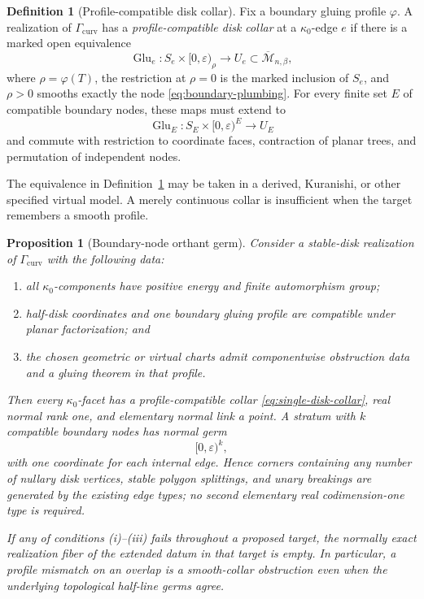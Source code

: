 \documentclass[11pt,letterpaper,twoside]{article}
\theoremstyle{plain}
\newtheorem{proposition}[theorem]{Proposition}
\theoremstyle{definition}
\newtheorem{definition}[theorem]{Definition}
\theoremstyle{remark}
\begin{document}
\begin{definition}[Profile-compatible disk collar]\label{def:profile-compatible-disk-collar}
Fix a boundary gluing profile \(\varphi\).  A realization of \(\Gamma_{\mathrm{curv}}\) has a \emph{profile-compatible disk collar} at a \(\kappa_0\)-edge \(e\) if there is a marked open equivalence
\begin{equation}\label{eq:single-disk-collar}
 \operatorname{Glu}_e:
 S_e\times[0,\varepsilon)_\rho
 \longrightarrow U_e\subset\overline{\mathcal M}_{n,\beta},
\end{equation}
where \(\rho=\varphi(T)\), the restriction at \(\rho=0\) is the marked inclusion of \(S_e\), and \(\rho>0\) smooths exactly the node \eqref{eq:boundary-plumbing}.  For every finite set \(E\) of compatible boundary nodes, these maps must extend to
\begin{equation}\label{eq:multi-disk-collar}
 \operatorname{Glu}_E:
 S_E\times[0,\varepsilon)^E
 \longrightarrow U_E
\end{equation}
and commute with restriction to coordinate faces, contraction of planar trees, and permutation of independent nodes.
\end{definition}

The equivalence in Definition~\ref{def:profile-compatible-disk-collar} may be taken in a derived, Kuranishi, or other specified virtual model.  A merely continuous collar is insufficient when the target remembers a smooth profile.

\begin{proposition}[Boundary-node orthant germ]\label{prop:boundary-node-profile}
Consider a stable-disk realization of \(\Gamma_{\mathrm{curv}}\) with the following data:
\begin{enumerate}[label=\textup{(\roman*)}]
\item all \(\kappa_0\)-components have positive energy and finite automorphism group;
\item half-disk coordinates and one boundary gluing profile are compatible under planar factorization; and
\item the chosen geometric or virtual charts admit componentwise obstruction data and a gluing theorem in that profile.
\end{enumerate}
Then every \(\kappa_0\)-facet has a profile-compatible collar \eqref{eq:single-disk-collar}, real normal rank one, and elementary normal link a point.  A stratum with \(k\) compatible boundary nodes has normal germ
\begin{equation}\label{eq:disk-node-orthant}
 [0,\varepsilon)^k,
\end{equation}
with one coordinate for each internal edge.  Hence corners containing any number of nullary disk vertices, stable polygon splittings, and unary breakings are generated by the existing edge types; no second elementary real codimension-one type is required.

If any of conditions \textup{(i)}--\textup{(iii)} fails throughout a proposed target, the normally exact realization fiber of the extended datum in that target is empty.  In particular, a profile mismatch on an overlap is a smooth-collar obstruction even when the underlying topological half-line germs agree.
\end{proposition}
\end{document}
